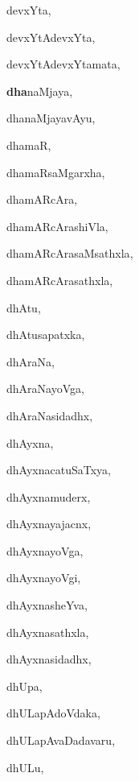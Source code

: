 \begin{multicols}{3}
{\noindent
{devxYta}, \pageref{devxYta}

\noindent
{devxYtAdevxYta}, \pageref{devxYtAdevxYta}

\noindent
{devxYtAdevxYtamata}, \pageref{devxYtAdevxYtamata}

\noindent
{{\large\textbf{dha}}naMjaya}, \pageref{dhanaMjaya}

\noindent
{dhanaMjayavAyu}, \pageref{dhanaMjayavAyu}

\noindent
{dhamaR}, \pageref{dhamaR}

\noindent
{dhamaRsaMgarxha}, \pageref{dhamaRsaMgarxha}

\noindent
{dhamARcAra}, \pageref{dhamARcAra}

\noindent
{dhamARcArashiVla}, \pageref{dhamARcArashiVla}

\noindent
{dhamARcArasaMsathxla}, \pageref{dhamARcArasaMsathxla}

\noindent
{dhamARcArasathxla}, \pageref{dhamARcArasathxla}

\noindent
{dhAtu}, \pageref{dhAtu}

\noindent
{dhAtusapatxka}, \pageref{dhAtusapatxka}

\noindent
{dhAraNa}, \pageref{dhAraNa}

\noindent
{dhAraNayoVga}, \pageref{dhAraNayoVga}

\noindent
{dhAraNasidadhx}, \pageref{dhAraNasidadhx}

\noindent
{dhAyxna}, \pageref{dhAyxna}

\noindent
{dhAyxnacatuSaTxya}, \pageref{dhAyxnacatuSaTxya}

\noindent
{dhAyxnamuderx}, \pageref{dhAyxnamuderx}

\noindent
{dhAyxnayajacnx}, \pageref{dhAyxnayajacnx}

\noindent
{dhAyxnayoVga}, \pageref{dhAyxnayoVga}

\noindent
{dhAyxnayoVgi}, \pageref{dhAyxnayoVgi}

\noindent
{dhAyxnasheYva}, \pageref{dhAyxnasheYva}

\noindent
{dhAyxnasathxla}, \pageref{dhAyxnasathxla}

\noindent
{dhAyxnasidadhx}, \pageref{dhAyxnasidadhx}

\noindent
{dhUpa}, \pageref{dhUpa}

\noindent
{dhULapAdoVdaka}, \pageref{dhULapAdoVdaka}

\noindent
{dhULapAvaDadavaru}, \pageref{dhULapAvaDadavaru}

\noindent
{dhULu}, \pageref{dhULu}

}
\end{multicols}
